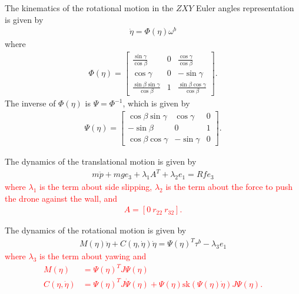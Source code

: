 The kinematics of the rotational motion in the $ZXY$ Euler angles representation is given by
\begin{align}
    \label{eq:kinematic_of_rotation_with_constraint_simplified_ver}
\dot{\eta} = \Phi(\eta) \omega^b
\end{align}
where
\begin{align*}
    \Phi(\eta) = 
    \begin{bmatrix}
        \frac{\sin \gamma}{\cos \beta} & 0 & \frac{\cos \gamma}{\cos \beta}\\
        \cos \gamma & 0 & - \sin \gamma\\
        \frac{\sin \beta \sin \gamma}{\cos \beta} & 1 & \frac{\sin \beta \cos \gamma}{\cos \beta}
    \end{bmatrix}.
\end{align*}
The inverse of $ \Phi(\eta) $ is $ \Psi = \Phi^{-1} $, which is given by
\begin{align}
    \label{eq:definition_of_Psi}
    \Psi(\eta) =
    \begin{bmatrix}
        \cos \beta \sin \gamma & \cos \gamma & 0 \\
        - \sin \beta & 0 & 1 \\
        \cos \beta \cos \gamma & - \sin \gamma & 0
    \end{bmatrix}.
\end{align}

The dynamics of the translational motion is given by
\begin{align}
	\label{eq:translational_dynamics}
	m\ddot{p}+mge_3 +\lambda_1 A^T +\lambda_2 e_1 = Rfe_3
\end{align}
\textcolor{red}{where $ \lambda_1 $ is the term about side slipping, $ \lambda_2 $ is the term about the force to push the drone against the wall, and
\begin{align}
    A = [0 ~ r_{22} ~ r_{32}].
\end{align}}

The dynamics of the rotational motion \cite{nonami_autonomous_2010} is given by
\begin{align}
    \label{eq:rotational_el_eq}
    M(\eta) \ddot{\eta} + C(\eta, \dot{\eta}) \dot{\eta} = \Psi(\eta)^T \tau^b - \lambda_3 e_1
\end{align}
\textcolor{red}{where $ \lambda_3 $ is the term about yawing and
\begin{align}
    \label{eq:definition_of_rotational_motion}
    M(\eta) &= \Psi(\eta)^T J \Psi(\eta) \\
    C(\eta,\dot{\eta}) &= \Psi(\eta)^T J \dot{\Psi} (\eta) + \Psi(\eta) \mathrm{sk}(\Psi(\eta) \dot{\eta}) J \Psi(\eta).
\end{align}}
